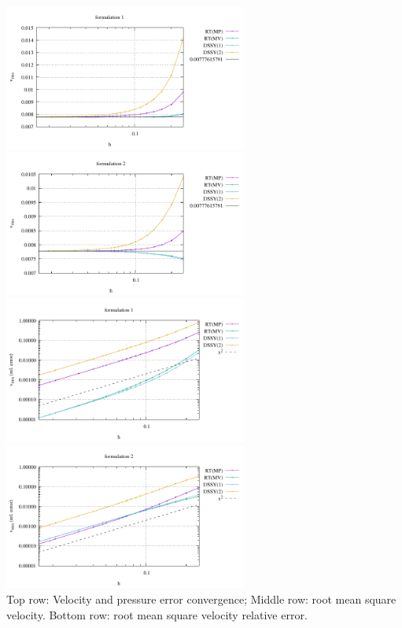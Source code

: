 \begin{itemize}
\begin{center}
\includegraphics[width=8cm]{python_codes/fieldstone_77/results/dh/vrms_form1}
\includegraphics[width=8cm]{python_codes/fieldstone_77/results/dh/vrms_form2}\\
\includegraphics[width=8cm]{python_codes/fieldstone_77/results/dh/vrms_form1_relerror}
\includegraphics[width=8cm]{python_codes/fieldstone_77/results/dh/vrms_form2_relerror}\\
{\captionfont Top row: Velocity and pressure error convergence; 
Middle row: root mean square velocity. 
Bottom row: root mean square velocity relative error.}
\end{center}


\end{itemize}
